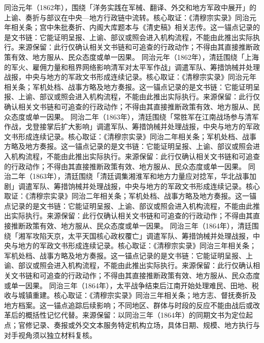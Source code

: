 同治元年（1862年），围绕「洋务实践在军械、翻译、外交和地方军政中展开」的上谕、奏折与部议在中央—地方行政链中流转。核心取证：《清穆宗实录》同治元年相关条；宫中朱批奏折、内阁大库题本与《清史稿》相关志传。这一锚点记录的是文书链：它能证明呈报、上谕、部议或照会进入机构流程，不能由此推出实际执行。来源保留：此行仅确认相关文书链和可追查的行政动作；不得由其直接推断政策有效、地方服从、民众态度或单一因果。
同治元年（1862年），清廷围绕「上海的军火、雇佣力量和租界网络影响清军对太平军作战」调遣军队、筹措饷械并处理战报，中央与地方的军政文书形成连续记录。核心取证：《清穆宗实录》同治元年相关条；军机处档、战事方略及地方奏报。这一锚点记录的是文书链：它能证明呈报、上谕、部议或照会进入机构流程，不能由此推出实际执行。来源保留：此行仅确认相关文书链和可追查的行政动作；不得由其直接推断政策有效、地方服从、民众态度或单一因果。
同治二年（1863年），清廷围绕「常胜军在江南战场参与清军作战，戈登接掌后扩大影响」调遣军队、筹措饷械并处理战报，中央与地方的军政文书形成连续记录。核心取证：《清穆宗实录》同治二年相关条；军机处档、战事方略及地方奏报。这一锚点记录的是文书链：它能证明呈报、上谕、部议或照会进入机构流程，不能由此推出实际执行。来源保留：此行仅确认相关文书链和可追查的行政动作；不得由其直接推断政策有效、地方服从、民众态度或单一因果。
同治二年（1863年），清廷围绕「清廷调集湘淮军和地方力量应对捻军，华北战事加剧」调遣军队、筹措饷械并处理战报，中央与地方的军政文书形成连续记录。核心取证：《清穆宗实录》同治二年相关条；军机处档、战事方略及地方奏报。这一锚点记录的是文书链：它能证明呈报、上谕、部议或照会进入机构流程，不能由此推出实际执行。来源保留：此行仅确认相关文书链和可追查的行政动作；不得由其直接推断政策有效、地方服从、民众态度或单一因果。
同治三年（1864年），清廷围绕「湘军攻陷天京，太平天国核心政权覆亡」调遣军队、筹措饷械并处理战报，中央与地方的军政文书形成连续记录。核心取证：《清穆宗实录》同治三年相关条；军机处档、战事方略及地方奏报。这一锚点记录的是文书链：它能证明呈报、上谕、部议或照会进入机构流程，不能由此推出实际执行。来源保留：此行仅确认相关文书链和可追查的行政动作；不得由其直接推断政策有效、地方服从、民众态度或单一因果。
同治三年（1864年），太平战争结束后江南开始处理难民、田地、税收与城镇重建。核心取证：《清穆宗实录》同治三年相关条；地方志、督抚奏折及地方档案。这一锚点追踪后续影响；不同地区、群体与时段的反应不能由战后或改革后的概括性记忆代替。来源保留：以同治三年（1864年）的同期文书为定位起点；官修记录、奏报或外交文本服务特定机构立场，具体日期、规模、地方执行与对手视角须以独立材料复核。
